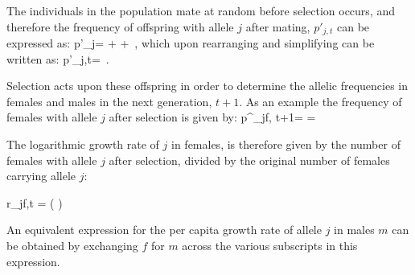 \documentclass[12pt]{article}
\let\oldequation\equation
\let\oldendequation\endequation
\renewenvironment{equation}
  {\linenomathNonumbers\oldequation}
  {\oldendequation\endlinenomath}
\begin{document}
The individuals in the population mate at random before selection occurs, and therefore the frequency of offspring with allele $j$ after mating, $p'_{j,t}$ can be expressed as:
\begin{equation}
   p'_{j}=   +    +
     \,,
\end{equation}
which upon rearranging and simplifying can be written as:
\begin{equation}
   p'_{j,t}=  \,.
   \label{pprime}
\end{equation}

Selection acts upon these offspring in order to determine the allelic frequencies in females and males in the next generation, $t+1$. As an example the frequency  of females with allele $j$ after selection is given by:
\begin{equation}
   p^{\prime}_{jf, t+1}=  = 
   \label{next_gen}
\end{equation}

The logarithmic growth rate of $j$ in females, is therefore given by the number of females with allele $j$ after selection, divided by the original number of females carrying allele $j$:



\begin{equation}
    r_{jf,t} = \ln \left(  \right)
    \label{canonical}
\end{equation}


An equivalent expression for the per capita growth rate of allele $j$ in males $m$ can be obtained by exchanging $f$ for $m$ across the various subscripts in this expression.
\end{document}
